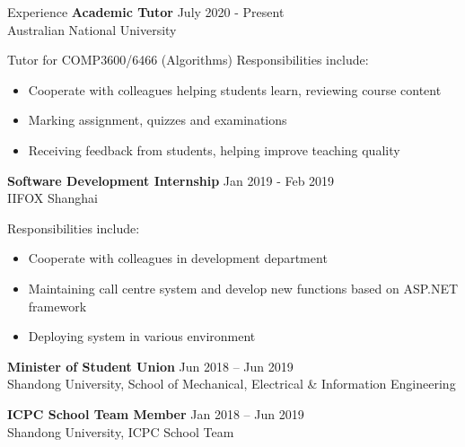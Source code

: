 \documentclass{resume} %
\begin{document}
\begin{rSection}{Experience}
{\bf Academic Tutor} \hfill {July 2020 - Present}\\
{Australian National University}

Tutor for COMP3600/6466 (Algorithms) Responsibilities include:
\begin{itemize}
	\item Cooperate with colleagues helping students learn, reviewing course content
	\item Marking assignment, quizzes and examinations
	\item Receiving feedback from students, helping improve teaching quality
\end{itemize}


{\bf Software Development Internship} \hfill {Jan 2019 - Feb 2019}\\
{IIFOX Shanghai}

Responsibilities include:
\begin{itemize}
	\item Cooperate with colleagues in development department
	\item Maintaining call centre system and develop new functions based on ASP.NET framework
	\item Deploying system in various environment
\end{itemize}
 
{\bf Minister of Student Union} \hfill {Jun 2018 – Jun 2019}\\
{Shandong University, School of Mechanical, Electrical \& Information Engineering}

{\bf ICPC School Team Member} \hfill {Jan 2018 – Jun 2019}\\
{Shandong University, ICPC School Team}

\end{rSection}
\end{document}
